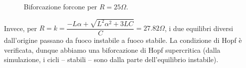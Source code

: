 \begin{enumerate}
\begin{figure}
\begin{center}
\vfill
{}
\caption{Biforcazione forcone per $R=25 \Omega$.}
\label{fig:forcone}
\end{center}
\end{figure}

Invece, per $R=k=\dfrac{-L\alpha + \sqrt{L^2\alpha^2+3LC}}{C} = 27.82 \Omega$, i due equilibri diversi dall'origine passano da fuoco instabile a fuoco stabile. La condizione di Hopf è verificata, dunque abbiamo una biforcazione di Hopf supercritica (dalla simulazione, i cicli – stabili – sono dalla parte dell'equilibrio instabile).


\end{enumerate}
